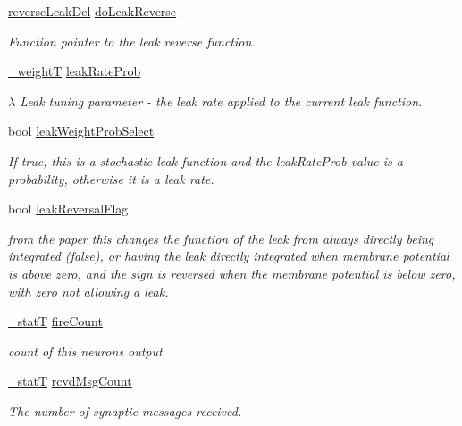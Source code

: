 \begin{DoxyCompactItemize}
\hyperlink{structreverse_leak_del}{reverse\+Leak\+Del} \hyperlink{structneuron_state_af4ded7f575b64ada6c0a6664f638307c}{do\+Leak\+Reverse}
\begin{DoxyCompactList}\small\item\em Function pointer to the leak reverse function. \end{DoxyCompactList}\item 
\hyperlink{assist_8h_aa73c5ea0fe4ba938c96e6771b38dcb2a}{\+\_\+weight\+T} \hyperlink{structneuron_state_ac580cc92949834b3675de3aae267e8e7}{leak\+Rate\+Prob}
\begin{DoxyCompactList}\small\item\em $𝜆$ Leak tuning parameter -\/ the leak rate applied to the current leak function. \end{DoxyCompactList}\item 
bool \hyperlink{structneuron_state_a20889d9b55895bcc719d6aad2766b8f8}{leak\+Weight\+Prob\+Select}
\begin{DoxyCompactList}\small\item\em If true, this is a stochastic leak function and the {\itshape leak\+Rate\+Prob} value is a probability, otherwise it is a leak rate. \end{DoxyCompactList}\item 
bool \hyperlink{structneuron_state_a11691cf6bf906102089c842e78be55fe}{leak\+Reversal\+Flag}
\begin{DoxyCompactList}\small\item\em from the paper this changes the function of the leak from always directly being integrated (false), or having the leak directly integrated when membrane potential is above zero, and the sign is reversed when the membrane potential is below zero, with zero not allowing a leak. \end{DoxyCompactList}\item 
\hyperlink{assist_8h_ad77e6fc5a9b03d46e7c97b7c4b92e89f}{\+\_\+stat\+T} \hyperlink{structneuron_state_afe8825076c4cf3863c677307fec63c61}{fire\+Count}
\begin{DoxyCompactList}\small\item\em count of this neuron\textquotesingle{}s output \end{DoxyCompactList}\item 
\hyperlink{assist_8h_ad77e6fc5a9b03d46e7c97b7c4b92e89f}{\+\_\+stat\+T} \hyperlink{structneuron_state_ab8f63a1dfdb2992657530ff8a63fdc01}{rcvd\+Msg\+Count}
\begin{DoxyCompactList}\small\item\em The number of synaptic messages received. \end{DoxyCompactList}\item 

\end{DoxyCompactItemize}

